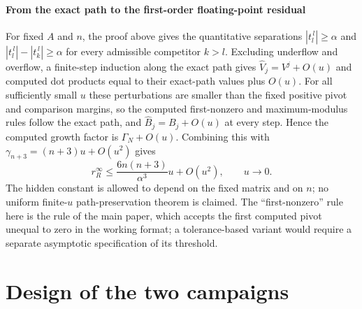 \documentclass[supplement,review,onefignum,onetabnum]{siamart251216}
\begin{document}
\paragraph{From the exact path to the first-order floating-point residual}
For fixed $A$ and $n$, the proof above gives the quantitative separations
$|t_l^{\,l}|\ge\alpha$ and
$|t_l^{\,l}|-|t_k^{\,l}|\ge\alpha$ for every admissible competitor $k>l$. Excluding underflow and
overflow, a finite-step induction along the exact path gives
$\widehat V_j=V^j+O(u)$ and computed dot products equal to their exact-path values plus $O(u)$.
For all sufficiently small $u$ these perturbations are smaller than the fixed positive pivot and
comparison margins, so the computed first-nonzero and maximum-modulus rules follow the exact path,
and $\widehat B_j=B_j+O(u)$ at every step. Hence the computed growth factor is
$\Gamma_N+O(u)$. Combining this with
$\gamma_{n+3}=(n+3)u+O(u^2)$ gives
%
\[
r_R^\infty
\le
\frac{6n(n+3)}{\alpha^3}u+O(u^2),
\qquad u\to0.
\]
%
The hidden constant is allowed to depend on the fixed matrix and on $n$; no uniform finite-$u$
path-preservation theorem is claimed. The ``first-nonzero'' rule here is the rule of the main paper,
which accepts the first computed pivot unequal to zero in the working format; a tolerance-based
variant would require a separate asymptotic specification of its threshold.

\section{Design of the two campaigns}
\label{sm:design}
\end{document}
